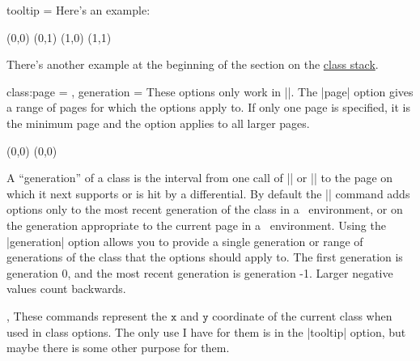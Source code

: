 \begin{sseqdata}[name = basic, cohomological Serre grading]
\begin{key}{tooltip = }
Here's an example:
\begin{codeexample}[]
\begin{sseqpage}[classes = {tooltip = {(\xcoord,\ycoord)}}]
\class(0,0)
\class(0,1)
\class(1,0)
\class(1,1)
\end{sseqpage}
\end{codeexample}

There's another example at the beginning of the section on the
\hyperref[sec:class stack]{class stack}.
\end{key}

\begin{keylist}{
    class:page = ,
    generation = 
}
\def\classpagehandler#1#2{\textcolor{keycolor}{\noligs{#2}}}
These options only work in |\classoptions|. The |page| option gives a range of
pages for which the options apply to. If only one page is specified, it is the
minimum page and the option applies to all larger pages.
\begin{codeexample}[width = 6cm]
\begin{sseqdata}[ name = page_example, no axes,
    title = \page, title style = {yshift = -0.5cm} ]
\class(0,0)
\classoptions[class:page = 2 -- 3, fill, blue](0,0)
\end{sseqdata}

\printpage[ name = page_example, page = 1 ] \qquad
\printpage[ name = page_example, page = 2 ] \qquad
\printpage[ name = page_example, page = 4 ]
\end{codeexample}
A ``generation'' of a class is the interval from one call of |\class| or
|\replaceclass| to the page on which it next supports or is hit by a
differential. By default the |\classoptions| command adds options only to the
most recent generation of the class in a \sseqdataenv\  environment, or on the
generation appropriate to the current page in a \sseqpageenv\  environment.
Using the |generation| option allows you to provide a single generation or range
of generations of the class that the options should apply to. The first
generation is generation 0, and the most recent generation is generation -1.
Larger negative values count backwards.
\codeexample[from file=class-page2a]
\codeexample[from file=class-page2b]
\end{keylist}

\begin{commandlist}{\xcoord,\ycoord}
These commands represent the $\mathtt{x}$ and $\mathtt{y}$ coordinate of the
current class when used in class options. The only use I have for them is in the
|tooltip| option, but maybe there is some other purpose for them.
\end{commandlist}



\end{sseqdata}
